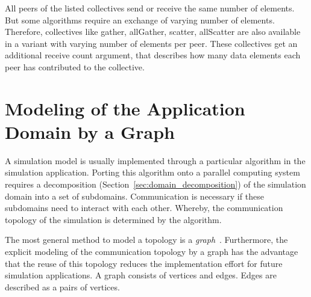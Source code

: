 \noindent All peers of the listed collectives send or receive the same number of
elements.  But some algorithms require an exchange of varying number
of elements. Therefore, collectives like gather, allGather, scatter,
allScatter are also available in a variant with varying number of
elements per peer. These collectives get an additional receive count
argument, that describes how many data elements each peer has
contributed to the collective.



\section{Modeling of the Application Domain by a Graph}
\label{sec:graph}
A simulation model is usually implemented through a particular
algorithm in the simulation application.  Porting this algorithm onto
a parallel computing system requires a decomposition
(Section~\ref{sec:domain_decomposition}) of the simulation domain into
a set of subdomains.  Communication is necessary if these subdomains
need to interact with each other.  Whereby, the communication topology
of the simulation is determined by the algorithm.




The most general method to model a topology is a
\emph{graph}~\cite{ref:graph}. Furthermore, the explicit modeling of
the communication topology by a graph has the advantage that the reuse
of this topology reduces the implementation effort for future
simulation applications.  A graph consists of vertices and
edges. Edges are described as a pairs of vertices.

